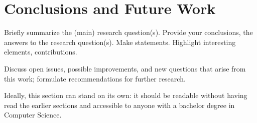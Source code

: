 \section{Conclusions and Future Work}
\label{sec:conclusion}
Briefly summarize the (main) research question(s).
Provide your conclusions, the answers to the research question(s).
Make statements.
Highlight interesting elements, contributions.

Discuss open issues, possible improvements, and new questions that arise from this work; formulate recommendations for further research.

Ideally, this section can stand on its own: it should be readable without having read the earlier sections and accessible to anyone with a bachelor degree in Computer Science.
